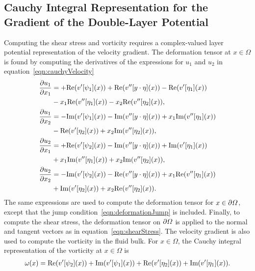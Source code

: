 \documentclass{jfm}
\begin{document}
\subsection{Cauchy Integral Representation for the Gradient of the
Double-Layer Potential}
\label{sec:gradDLPcomplex}
Computing the shear stress and vorticity requires a complex-valued layer
potential representation of the velocity gradient.  The deformation
tensor at $x \in \Omega$ is found by computing the derivatives of the
expressions for $u_1$ and $u_2$ in equation~\eqref{eqn:cauchyVelocity}  
\begin{equation}
\label{eqn:cauchyGradient}
  \begin{aligned}
    \frac{\partial u_1}{\partial x_1} &= +\mbox{Re} (v'[\psi_1](x)) + 
    \mbox{Re} (v''[y\cdot\eta](x)) - \mbox{Re} (v'[\eta_1](x)) \\
    &- x_1\mbox{Re} (v''[\eta_1](x)) - x_2\mbox{Re} (v''[\eta_2](x)), \\
    \frac{\partial u_1}{\partial x_2} &= - \mbox{Im} (v'[\psi_1](x)) - 
    \mbox{Im} (v''[y\cdot\eta](x)) + x_1\mbox{Im} (v''[\eta_1](x)) \\
    &- \mbox{Re} (v'[\eta_2](x)) + x_2\mbox{Im} (v''[\eta_2](x)), \\
    \frac{\partial u_2}{\partial x_1} &= +\mbox{Re} (v'[\psi_2](x)) - 
    \mbox{Im} (v''[y\cdot\eta](x)) + \mbox{Im} (v'[\eta_1](x))  \\
    &+ x_1\mbox{Im} (v''[\eta_1](x)) + x_2\mbox{Im} (v''[\eta_2](x)), \\
    \frac{\partial u_2}{\partial x_2} &= -\mbox{Im} (v'[\psi_2](x)) - 
    \mbox{Re} (v''[y\cdot\eta](x)) + x_1\mbox{Re} (v''[\eta_1](x)) \\
    &+ \mbox{Im} (v'[\eta_2](x)) + x_2\mbox{Re} (v''[\eta_2](x)).
  \end{aligned}
\end{equation}
The same expressions are used to compute the deformation tensor for $x
\in {\partial}\varOmega$, except that the jump
condition~\eqref{eqn:deformationJump} is included.  Finally, to compute
the shear stress, the deformation tensor on ${\partial}\varOmega$ is applied to
the normal and tangent vectors as in equation~\eqref{eqn:shearStress}.
The velocity gradient is also used to compute the vorticity in the fluid
bulk.  For $x \in \Omega$, the Cauchy integral representation of the
vorticity at $x \in \Omega$ is
\begin{align}
  \omega(x) = 
    \mbox{Re} (v'[\psi_2](x)) + \mbox{Im} (v'[\psi_1](x))+ 
    \mbox{Re} (v'[\eta_2](x))+ \mbox{Im} (v'[\eta_1](x)).
\end{align}
\end{document}

